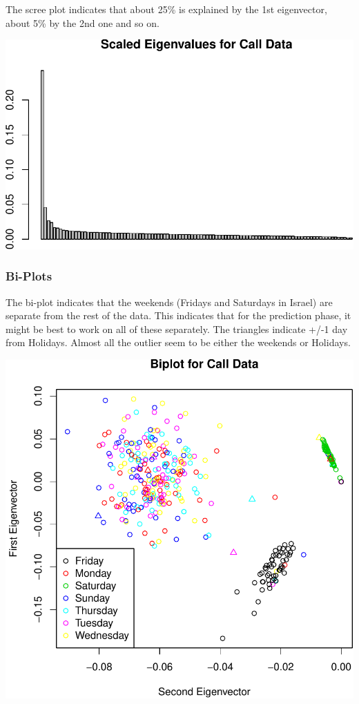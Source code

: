 \documentclass[]{article}
\begin{document}
The scree plot indicates that about 25\% is explained by the 1st
eigenvector, about 5\% by the 2nd one and so on.

\includegraphics{call_center_data_files/figure-latex/scree-1.pdf}

\subsubsection{Bi-Plots}\label{bi-plots}

The bi-plot indicates that the weekends (Fridays and Saturdays in
Israel) are separate from the rest of the data. This indicates that for
the prediction phase, it might be best to work on all of these
separately. The triangles indicate +/-1 day from Holidays. Almost all
the outlier seem to be either the weekends or Holidays.

\includegraphics{call_center_data_files/figure-latex/biplot-1.pdf}
\end{document}
